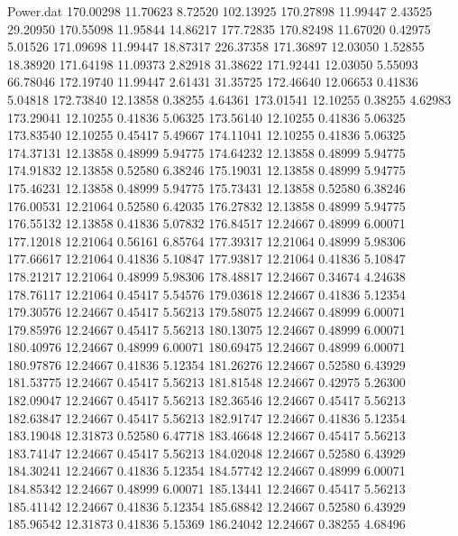 \begin{filecontents}{Power.dat}
 170.00298   11.70623    8.72520  102.13925
 170.27898   11.99447    2.43525   29.20950
 170.55098   11.95844   14.86217  177.72835
 170.82498   11.67020    0.42975    5.01526
 171.09698   11.99447   18.87317  226.37358
 171.36897   12.03050    1.52855   18.38920
 171.64198   11.09373    2.82918   31.38622
 171.92441   12.03050    5.55093   66.78046
 172.19740   11.99447    2.61431   31.35725
 172.46640   12.06653    0.41836    5.04818
 172.73840   12.13858    0.38255    4.64361
 173.01541   12.10255    0.38255    4.62983
 173.29041   12.10255    0.41836    5.06325
 173.56140   12.10255    0.41836    5.06325
 173.83540   12.10255    0.45417    5.49667
 174.11041   12.10255    0.41836    5.06325
 174.37131   12.13858    0.48999    5.94775
 174.64232   12.13858    0.48999    5.94775
 174.91832   12.13858    0.52580    6.38246
 175.19031   12.13858    0.48999    5.94775
 175.46231   12.13858    0.48999    5.94775
 175.73431   12.13858    0.52580    6.38246
 176.00531   12.21064    0.52580    6.42035
 176.27832   12.13858    0.48999    5.94775
 176.55132   12.13858    0.41836    5.07832
 176.84517   12.24667    0.48999    6.00071
 177.12018   12.21064    0.56161    6.85764
 177.39317   12.21064    0.48999    5.98306
 177.66617   12.21064    0.41836    5.10847
 177.93817   12.21064    0.41836    5.10847
 178.21217   12.21064    0.48999    5.98306
 178.48817   12.24667    0.34674    4.24638
 178.76117   12.21064    0.45417    5.54576
 179.03618   12.24667    0.41836    5.12354
 179.30576   12.24667    0.45417    5.56213
 179.58075   12.24667    0.48999    6.00071
 179.85976   12.24667    0.45417    5.56213
 180.13075   12.24667    0.48999    6.00071
 180.40976   12.24667    0.48999    6.00071
 180.69475   12.24667    0.48999    6.00071
 180.97876   12.24667    0.41836    5.12354
 181.26276   12.24667    0.52580    6.43929
 181.53775   12.24667    0.45417    5.56213
 181.81548   12.24667    0.42975    5.26300
 182.09047   12.24667    0.45417    5.56213
 182.36546   12.24667    0.45417    5.56213
 182.63847   12.24667    0.45417    5.56213
 182.91747   12.24667    0.41836    5.12354
 183.19048   12.31873    0.52580    6.47718
 183.46648   12.24667    0.45417    5.56213
 183.74147   12.24667    0.45417    5.56213
 184.02048   12.24667    0.52580    6.43929
 184.30241   12.24667    0.41836    5.12354
 184.57742   12.24667    0.48999    6.00071
 184.85342   12.24667    0.48999    6.00071
 185.13441   12.24667    0.45417    5.56213
 185.41142   12.24667    0.41836    5.12354
 185.68842   12.24667    0.52580    6.43929
 185.96542   12.31873    0.41836    5.15369
 186.24042   12.24667    0.38255    4.68496

\end{filecontents}
